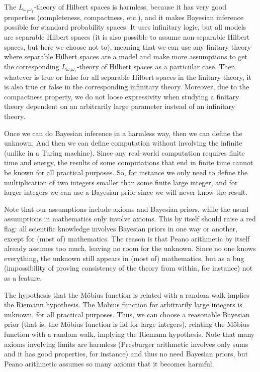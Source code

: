 \documentclass[11pt]{book}
\begin{document}
The \(L_{\omega_1\omega_1}\)-theory of Hilbert spaces
\cite{kopperman_l-theory_1967} is
harmless, because it has very good properties (completeness,
compactness, etc.), and it makes Bayesian inference possible for
standard probability spaces. It uses infinitary logic, but all models
are separable Hilbert spaces (it is also possible to assume
non-separable Hilbert spaces, but here we choose not to), meaning that
we can use any finitary theory where separable Hilbert spaces are a
model and make more assumptions to get the corresponding
\(L_{\omega_1\omega_1}\)-theory of Hilbert spaces as a particular case.
Then whatever is true or false for all separable Hilbert spaces in the
finitary theory, it is also true or false in the corresponding
infinitary theory. Moreover, due to the compactness property, we do not
loose expressivity when studying a finitary theory dependent on an
arbitrarily large parameter instead of an infinitary theory.

Once we can do Bayesian inference in a harmless way, then we can define
the unknown. And then we can define computation without involving the
infinite (unlike in a Turing machine). Since any real-world computation
requires finite time and energy, the results of some computations that
end in finite time cannot be known for all practical purposes. So, for
instance we only need to define the multiplication of two integers
smaller than some finite large integer, and for larger integers we can
use a Bayesian prior since we will never know the result.

Note that our assumptions include axioms and Bayesian priors, while the
usual assumptions in mathematics only involve axioms. This by itself
should raise a red flag: all scientific knowledge involves Bayesian
priors in one way or another, except for (most of) mathematics. The
reason is that Peano arithmetic by itself already assumes too much,
leaving no room for the unknown. Since no one knows everything, the
unknown still appears in (most of) mathematics, but as a bug
(impossibility of proving consistency of the theory from within, for
instance) not as a feature.

The hypothesis that the Möbius function is related with a random walk
implies the Riemann hypothesis. The Möbius function for arbitrarily
large integers is unknown, for all practical purposes. Thus, we can
choose a reasonable Bayesian prior (that is, the Möbius function is iid
for large integers), relating the Möbius function with a random walk,
implying the Riemann hypothesis. Note that many axioms involving limits
are harmless (Presburger arithmetic involves only sums and it has good
properties, for instance) and thus no need Bayesian priors, but Peano
arithmetic assumes so many axioms that it becomes harmful.
\end{document}
